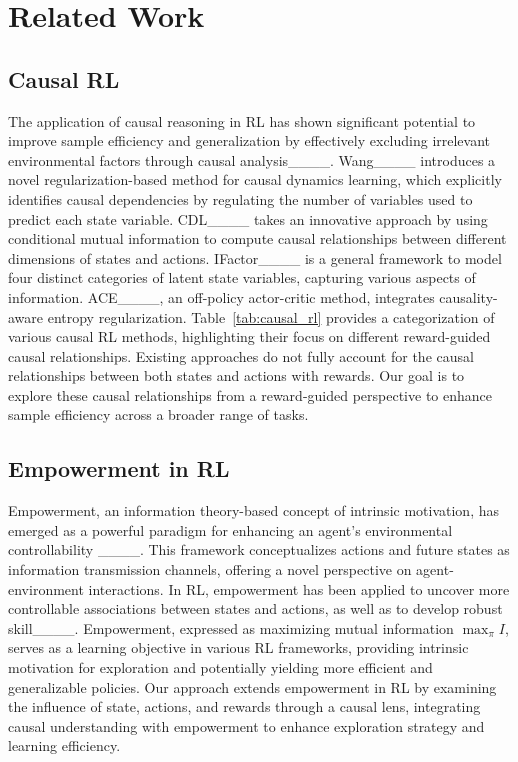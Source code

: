 \section{Related Work}
\vspace{-1mm}
\subsection{Causal RL} 
\vspace{-1mm}
The application of causal reasoning in RL has shown significant potential to improve sample efficiency and generalization by effectively excluding irrelevant environmental factors through causal analysis____. Wang____ introduces a novel regularization-based method for causal dynamics learning, which explicitly identifies causal dependencies by regulating the number of variables used to predict each state variable. 
CDL____ takes an innovative approach by using conditional mutual information to compute causal relationships between different dimensions of states and actions. 
IFactor____ is a general framework to model four distinct categories of latent state variables, capturing various aspects of information. ACE____, an off-policy actor-critic method, integrates causality-aware entropy regularization. Table~\ref{tab:causal_rl} provides a categorization of various causal RL methods, highlighting their focus on different reward-guided causal relationships. 
Existing approaches do not fully account for the causal relationships between both states and actions with rewards. Our goal is to explore these causal relationships from a reward-guided perspective to enhance sample efficiency across a broader range of tasks.
\vspace{-3mm}

\subsection{Empowerment in RL}
\vspace{-2mm}
Empowerment, an information theory-based concept of intrinsic motivation, has emerged as a powerful paradigm for enhancing an agent's environmental controllability ____. This framework conceptualizes actions and future states as information transmission channels, offering a novel perspective on agent-environment interactions. 
In RL, empowerment has been applied to uncover more controllable associations between states and actions, as well as to develop robust skill____. Empowerment, expressed as maximizing mutual information $\max_{\pi} I$, serves as a learning objective in various RL frameworks, providing intrinsic motivation for exploration and potentially yielding more efficient and generalizable policies. Our approach extends empowerment in RL by examining the influence of state, actions, and rewards through a causal lens, integrating causal understanding with empowerment to enhance exploration strategy and learning efficiency.
\vspace{-3mm}



